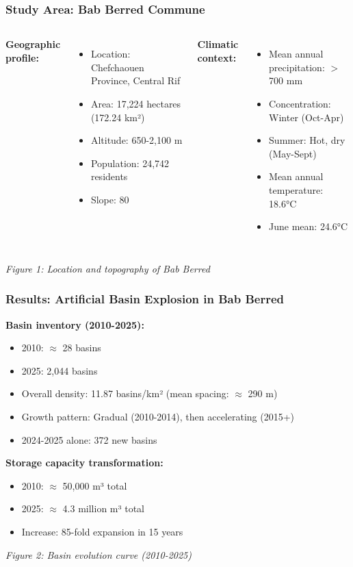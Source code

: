 \documentclass{beamer}
\begin{document}
\begin{frame}
\frametitle{Study Area: Bab Berred Commune}
\begin{columns}[T]
  \textbf{Geographic profile:}
  \begin{itemize}
    \item Location: Chefchaouen Province, Central Rif
    \item Area: 17,224 hectares (172.24 km²)
    \item Altitude: 650-2,100 m
    \item Population: 24,742 residents
    \item Slope: 80%
  \end{itemize}

  \textbf{Climatic context:}
  \begin{itemize}
    \item Mean annual precipitation: $>$ 700 mm
    \item Concentration: Winter (Oct-Apr)
    \item Summer: Hot, dry (May-Sept)
    \item Mean annual temperature: 18.6°C
    \item June mean: 24.6°C
  \end{itemize}
\end{columns}

\begin{center}
  \small{\textit{Figure 1: Location and topography of Bab Berred}}
\end{center}
\end{frame}

\begin{frame}
\frametitle{Results: Artificial Basin Explosion in Bab Berred}

\textbf{Basin inventory (2010-2025):}
\begin{itemize}
  \item 2010: $\approx$ 28 basins
  \item 2025: 2,044 basins
  \item Overall density: 11.87 basins/km² (mean spacing: $\approx$ 290 m)
  \item Growth pattern: Gradual (2010-2014), then accelerating (2015+)
  \item 2024-2025 alone: 372 new basins
\end{itemize}

\textbf{Storage capacity transformation:}
\begin{itemize}
  \item 2010: $\approx$ 50,000 m³ total
  \item 2025: $\approx$ 4.3 million m³ total
  \item Increase: 85-fold expansion in 15 years
\end{itemize}

\begin{center}
  \small{\textit{Figure 2: Basin evolution curve (2010-2025)}}
\end{center}
\end{frame}
\end{document}
